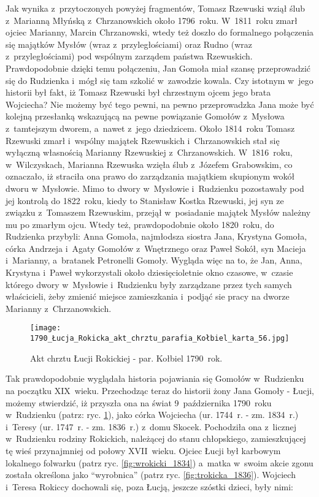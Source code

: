 Jak wynika z~przytoczonych powyżej fragmentów, Tomasz Rzewuski wziął ślub 
z~Marianną Młyńską z~Chrzanowskich około 1796~roku. W~1811~roku zmarł ojciec 
Marianny, Marcin Chrzanowski, wtedy też doszło do formalnego połączenia się 
majątków Mysłów (wraz z~przyległościami) oraz Rudno (wraz z~przyległościami) 
pod wspólnym zarządem państwa Rzewuskich. Prawdopodobnie dzięki temu 
połączeniu, Jan Gomoła miał szansę przeprowadzić się do Rudzienka i~mógł się 
tam szkolić w~zawodzie kowala. Czy istotnym w~jego historii był fakt, iż 
Tomasz Rzewuski był chrzestnym ojcem jego brata Wojciecha? Nie możemy być 
tego pewni, na pewno przeprowadzka Jana może być kolejną przesłanką 
wskazującą na pewne powiązanie Gomołów z~Mysłowa z~tamtejszym dworem, a~nawet 
z~jego dziedzicem. Około 1814~roku Tomasz Rzewuski zmarł i~wspólny majątek 
Rzewuskich i~Chrzanowskich stał się wyłączną własnością Marianny Rzewuskiej 
z~Chrzanowskich. W~1816~roku, w~Wilczyskach, Marianna Rzewuska wzięła ślub 
z~Józefem Grabowskim, co oznaczało, iż straciła ona prawo do zarządzania 
majątkiem skupionym wokół dworu w~Mysłowie. Mimo to dwory w~Mysłowie 
i~Rudzienku pozostawały pod jej kontrolą do 1822~roku, kiedy to Stanisław 
Kostka Rzewuski, jej syn ze związku z~Tomaszem Rzewuskim, przejął 
w~posiadanie majątek Mysłów należny mu po zmarłym ojcu. Wtedy też, 
prawdopodobnie około 1820~roku, do Rudzienka przybyli: Anna Gomoła, 
najmłodsza siostra Jana, Krystyna Gomoła, córka Andrzeja i~Agaty Gomołów 
z~Wnętrznego oraz Paweł Sokół, syn Macieja i~Marianny, a~bratanek Petronelli 
Gomoły. Wygląda więc na to, że Jan, Anna, Krystyna i~Paweł wykorzystali około 
dziesięcioletnie okno czasowe, w~czasie którego dwory w~Mysłowie i~Rudzienku 
były zarządzane przez tych samych właścicieli, żeby zmienić miejsce 
zamieszkania i~podjąć sie pracy na dworze Marianny z~Chrzanowskich.

\begin{figure}[!ht]
    \vspace*{0.5cm}
    \centering \texttt{[image: 
        1790\_Łucja\_Rokicka\_akt\_chrztu\_parafia\_Kołbiel\_karta\_56.jpg]}
    \captionsetup{format=hang}
    \caption{Akt chrztu Łucji Rokickiej - par. Kołbiel 1790~rok.}
    \label{fig:lrokicka_1790}
\end{figure}

Tak prawdopodobnie wyglądała historia pojawiania się Gomołów w~Rudzienku na 
początku XIX~wieku. Przechodząc teraz do historii żony Jana Gomoły - Łucji, 
możemy stwierdzić, iż przyszła ona na świat 9~października 1790~roku 
w~Rudzienku (patrz: ryc. \ref{fig:lrokicka_1790}), jako córka Wojciecha 
(ur. 1744~r. - zm. 1834~r.) i~Teresy (ur. 1747~r. - zm. 1836~r.) z~domu 
Skocek. Pochodziła ona z~licznej w~Rudzienku rodziny Rokickich, należącej do 
stanu chłopskiego, zamieszkującej tę wieś przynajmniej od połowy XVII~wieku. 
Ojciec Łucji był karbowym lokalnego folwarku (patrz ryc. 
\ref{fig:wrokicki_1834}) a~matka w~swoim akcie zgonu została określona jako 
\enquote{wyrobnica} (patrz ryc. \ref{fig:trokicka_1836}). Wojciech i~Teresa 
Rokiccy dochowali się, poza Łucją, jeszcze szóstki dzieci, były nimi:

